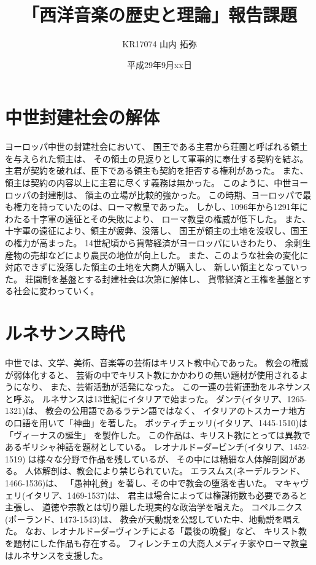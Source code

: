 \documentclass[a4j]{jarticle}
\title{「西洋音楽の歴史と理論」報告課題}
\author{KR17074 山内 拓弥}
\date{平成29年9月xx日}
\begin{document}

\section{中世封建社会の解体}

\large

ヨーロッパ中世の封建社会において、
国王である主君から荘園と呼ばれる領土を与えられた領主は、
その領土の見返りとして軍事的に奉仕する契約を結ぶ。
主君が契約を破れば、臣下である領主も契約を拒否する権利があった。
また、領主は契約の内容以上に主君に尽くす義務は無かった。
このように、中世ヨーロッパの封建制は、
領主の立場が比較的強かった。
この時期、ヨーロッパで最も権力を持っていたのは、ローマ教皇であった。
しかし、1096年から1291年にわたる十字軍の遠征とその失敗により、
ローマ教皇の権威が低下した。
また、十字軍の遠征により、領主が疲弊、没落し、
国王が領主の土地を没収し、国王の権力が高まった。
14世紀頃から貨幣経済がヨーロッパにいきわたり、
余剰生産物の売却などにより農民の地位が向上した。
また、このような社会の変化に対応できずに没落した領主の土地を大商人が購入し、
新しい領主となっていった。
荘園制を基盤とする封建社会は次第に解体し、
貨幣経済と王権を基盤とする社会に変わっていく。

\section{ルネサンス時代}

中世では、文学、美術、音楽等の芸術はキリスト教中心であった。
教会の権威が弱体化すると、
芸術の中でキリスト教にかかわりの無い題材が使用されるようになり、
また、芸術活動が活発になった。
この一連の芸術運動をルネサンスと呼ぶ。
ルネサンスは13世紀にイタリアで始まった。
ダンテ(イタリア、1265-1321)は、
教会の公用語であるラテン語ではなく、
イタリアのトスカーナ地方の口語を用いて「神曲」を著した。
ボッティチェッリ(イタリア、1445-1510)は「ヴィーナスの誕生」
を製作した。
この作品は、キリスト教にとっては異教であるギリシャ神話を題材としている。
レオナルド=ダ=ビンチ(イタリア、1452-1519)
は様々な分野で作品を残しているが、
その中には精細な人体解剖図がある。
人体解剖は、教会により禁じられていた。
エラスムス(ネーデルランド、1466-1536)は、
「愚神礼賛」を著し、その中で教会の堕落を書いた。
マキャヴェリ(イタリア、1469-1537)は、
君主は場合によっては権謀術数も必要であると主張し、
道徳や宗教とは切り離した現実的な政治学を唱えた。
コペルニクス(ポーランド、1473-1543)は、
教会が天動説を公認していた中、地動説を唱えた。
なお、レオナルド=ダ=ヴィンチによる「最後の晩餐」など、
キリスト教を題材にした作品も存在する。
フィレンチェの大商人メディチ家やローマ教皇はルネサンスを支援した。
\end{document}
